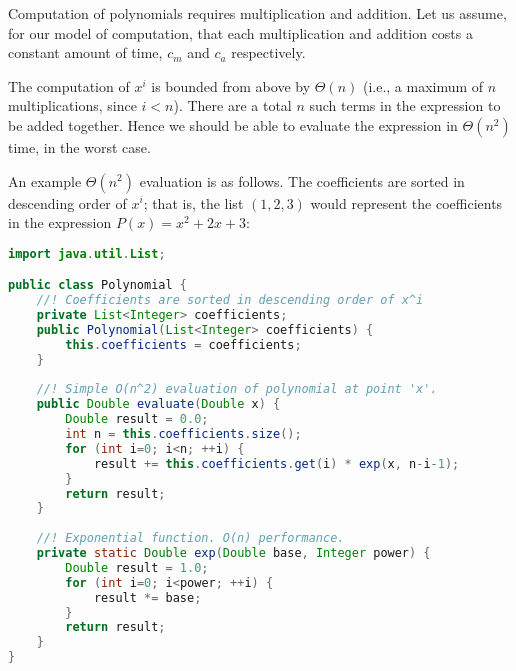 \documentclass[a4paper,12pt]{article}
\begin{document}
\vspace{5mm}


\newpage
Computation of polynomials requires multiplication and addition. Let us assume, for our model of computation, that each multiplication and addition costs a constant amount of time, $c_m$ and $c_a$ respectively. 

The computation of $x^i$ is bounded from above by $\Theta(n)$  (i.e., a maximum of $n$ multiplications, since $i < n$). There are a total $n$ such terms in the expression to be added together. Hence we should
be able to evaluate the expression in $\Theta(n^2)$ time, in the worst case. 

An example $\Theta(n^2)$ evaluation is as follows. The coefficients are sorted in descending order of
$x^i$; that is, the list $(1, 2, 3)$ would represent the coefficients in the expression $P(x) = x^2 + 2x + 3$:

\begin{lstlisting}[language=Java]
import java.util.List;

public class Polynomial {
    //! Coefficients are sorted in descending order of x^i
    private List<Integer> coefficients;
    public Polynomial(List<Integer> coefficients) {
        this.coefficients = coefficients;
    }
    
    //! Simple O(n^2) evaluation of polynomial at point 'x'.
    public Double evaluate(Double x) {
        Double result = 0.0;
        int n = this.coefficients.size();
        for (int i=0; i<n; ++i) {
            result += this.coefficients.get(i) * exp(x, n-i-1);
        }
        return result;
    }
    
    //! Exponential function. O(n) performance.
    private static Double exp(Double base, Integer power) {
        Double result = 1.0;
        for (int i=0; i<power; ++i) {
            result *= base;
        }
        return result;
    }
}

\end{lstlisting}
\end{document}
